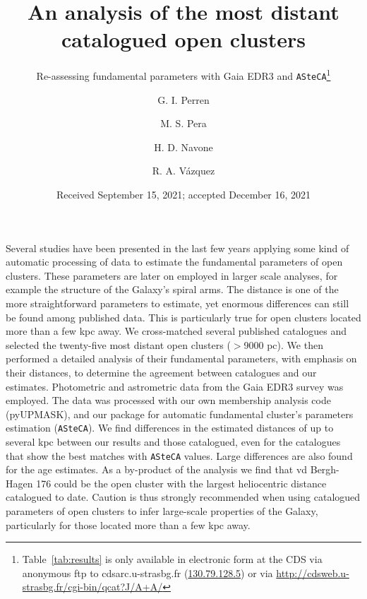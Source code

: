 \documentclass[draft]{aa}
\begin{document}
 


\title{An analysis of the most distant catalogued open clusters}
\subtitle{Re-assessing fundamental parameters with Gaia EDR3 and
\texttt{ASteCA}\thanks{
Table~\ref{tab:results} is only available in electronic form
at the CDS via anonymous ftp to cdsarc.u-strasbg.fr (\url{130.79.128.5})
or via \url{http://cdsweb.u-strasbg.fr/cgi-bin/qcat?J/A+A/}}}

\author{G. I. Perren
      \and
      M. S. Pera
      \and
      H. D. Navone
      \and
      R. A. Vázquez
}

\date{Received September 15, 2021; accepted December 16, 2021}

 
\abstract
{Several studies have been presented in the last few years applying some kind of
automatic processing of data to estimate the fundamental parameters of open
clusters. These parameters are later on employed in larger scale analyses, for
example the structure of the Galaxy's spiral arms.
The distance is one of the more straightforward parameters to estimate, yet
enormous differences can still be found among published data. This is
particularly true for open clusters located more than a few kpc away.}
{
We cross-matched several published catalogues and selected the twenty-five most
distant open clusters ($>$9000 pc). We then performed a detailed analysis of
their fundamental parameters, with emphasis on their distances, to determine the
agreement between catalogues and our estimates.}
{Photometric and astrometric data from the Gaia EDR3 survey was employed. The
data was processed with our own membership analysis code (pyUPMASK), and our
package for automatic fundamental cluster's parameters estimation
(\texttt{ASteCA}).}
{We find differences in the estimated distances of up to several kpc
between our results and those catalogued, even for the catalogues that show the
best matches with \texttt{ASteCA} values. Large differences are also found for
the age estimates. As a by-product of the analysis we find that
vd Bergh-Hagen 176 could be the open cluster with the largest heliocentric
distance catalogued to date.}
{Caution is thus strongly recommended when using catalogued parameters of open
clusters to infer large-scale properties of the Galaxy, particularly for those
located more than a few kpc away.}
\end{document}
